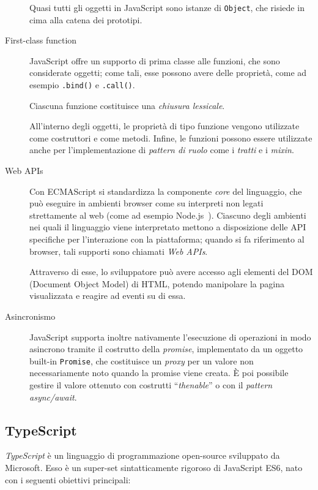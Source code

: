 \begin{description}
          Quasi tutti gli oggetti in JavaScript sono istanze di \texttt{Object}, che risiede in cima alla catena dei prototipi.

        \item[First-class function]
          JavaScript offre un supporto di prima classe alle funzioni, che sono considerate oggetti;
          come tali, esse possono avere delle proprietà, come ad esempio \texttt{.bind()} e \texttt{.call()}. %

          Ciascuna funzione costituisce una \emph{chiusura lessicale}.

          All'interno degli oggetti, le proprietà di tipo funzione vengono utilizzate come costruttori e come metodi.
          Infine, le funzioni possono essere utilizzate anche per l'implementazione di \emph{pattern di ruolo} come i \emph{tratti} e i \emph{mixin}.

        \item[Web APIs]
          Con ECMAScript si standardizza la componente \emph{core} del linguaggio, che può eseguire in ambienti browser come su interpreti non legati strettamente al web (come ad esempio Node.js~\cite{5617064}).
          Ciascuno degli ambienti nei quali il linguaggio viene interpretato mettono a disposizione delle API specifiche per l'interazione con la piattaforma;
          quando si fa riferimento al browser, tali supporti sono chiamati \emph{Web APIs}.

          Attraverso di esse, lo sviluppatore può avere accesso agli elementi del DOM (Document Object Model) di HTML, potendo manipolare la pagina visualizzata e reagire ad eventi su di essa.

        \item[Asincronismo]
          JavaScript supporta inoltre nativamente l'esecuzione di operazioni in modo asincrono tramite il costrutto della \emph{promise}, implementato da un oggetto built-in \texttt{Promise},
          che costituisce un \emph{proxy} per un valore non necessariamente noto quando la promise viene creata.
          È poi possibile gestire il valore ottenuto con costrutti ``\emph{thenable}'' o con il \emph{pattern async/await}.
      \end{description}

    \subsection{TypeScript}\label{subsec:ts}
      \emph{TypeScript} è un linguaggio di programmazione open-source sviluppato da Microsoft.
      Esso è un super-set sintatticamente rigoroso di JavaScript ES6, nato con i seguenti obiettivi principali:

